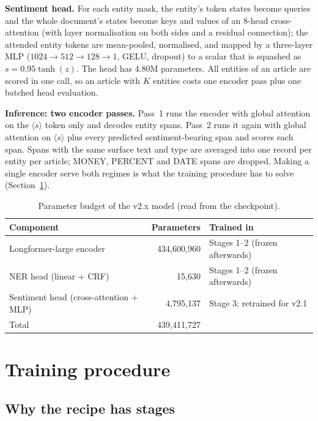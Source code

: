 \documentclass[11pt,letterpaper]{article}
\begin{document}
\textbf{Sentiment head.} For each entity mask, the entity's token states become queries and the
whole document's states become keys and values of an 8-head cross-attention (with layer
normalisation on both sides and a residual connection); the attended entity tokens are mean-pooled,
normalised, and mapped by a three-layer MLP ($1024\to512\to128\to1$, GELU, dropout) to a scalar
that is squashed as $s = 0.95\tanh(z)$. The head has 4.80M parameters. All entities of an
article are scored in one call, so an article with $K$ entities costs one encoder pass plus one
batched head evaluation.

\textbf{Inference: two encoder passes.} Pass~1 runs the encoder with global attention on the
$\langle s\rangle$ token only and decodes entity spans. Pass~2 runs it again with global attention
on $\langle s\rangle$ plus every predicted sentiment-bearing span and scores each span. Spans with
the same surface text and type are averaged into one record per entity per article; MONEY,
PERCENT and DATE spans are dropped. Making a single encoder serve both regimes is what the
training procedure has to solve (Section~\ref{sec:training}).

\begin{table}[H]
\centering\small
\begin{tabular}{@{}lrl@{}}
\toprule
\textbf{Component} & \textbf{Parameters} & \textbf{Trained in} \\
\midrule
Longformer-large encoder & 434{,}600{,}960 & Stages 1--2 (frozen afterwards) \\
NER head (linear + CRF) & 15{,}630 & Stages 1--2 (frozen afterwards) \\
Sentiment head (cross-attention + MLP) & 4{,}795{,}137 & Stage 3; retrained for v2.1 \\
\midrule
Total & 439{,}411{,}727 & \\
\bottomrule
\end{tabular}
\caption{Parameter budget of the v2.x model (read from the checkpoint).}
\label{tab:params}
\end{table}

\section{Training procedure}
\label{sec:training}

\subsection{Why the recipe has stages}
\end{document}
